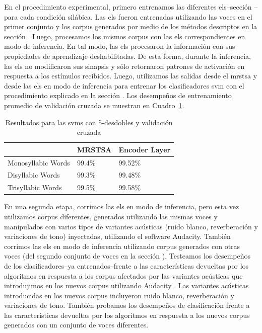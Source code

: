 {En el procedimiento experimental, primero entrenamos las diferentes \glspl{el}--sección --para cada condición silábica. Las \glspl{el}  fueron entrenadas utilizando las voces en el primer conjunto y los corpus generados por medio de los métodos descriptos en la sección . Luego, procesamos los mismos corpus con las \glspl{el} correspondientes en modo de inferencia. En tal modo, las \glspl{el} procesaron la información con sus propiedades de aprendizaje deshabilitadas. De esta forma, durante la inferencia, las \glspl{el} no modificaron sus sinapsis y sólo retornaron patrones de activación en respuesta a los estímulos recibidos. Luego, utilizamos las salidas desde el \gls{mrstsa} y desde las \glspl{el} en modo de inferencia para entrenar los clasificadores \gls{svm} con el procedimiento explicado en la sección . Los desempeños de entrenamiento promedio de validación cruzada se muestran en Cuadro~\ref{SVM_Training}.

\begin{table}[h!]
\centering
\caption{Resultados para las \glspl{svm} con 5-desdobles y validación cruzada}
\begin{tabular}{|l|l|l|}
\hline
		   & MRSTSA & Encoder Layer \\ \hline
Monosyllabic Words & 99.4\% & 99.52\%          \\ \hline
Disyllabic Words   & 99.3\%   & 99.48\%        \\ \hline
Trisyllabic Words  & 99.5\% & 99.58\%          \\ \hline
\end{tabular}
\label{SVM_Training}
\end{table}

En una segunda etapa, corrimos las \glspl{el} en modo de inferencia, pero esta vez utilizamos corpus diferentes, generados utilizando las mismas voces y manipulados con varios tipos de variantes acústicas (ruido blanco, reverberación y variaciones de tono) inyectadas, utilizando el software Audacity. También corrimos las \glspl{el} en modo de inferencia utilizando corpus generados con otras voces (del segundo conjunto de voces en la sección ). Testeamos los desempeños de los clasificadores--ya entrenados--frente a las características devueltas por los algoritmos en respuesta a los corpus afectados por las variantes acústicas que introdujimos en los nuevos corpus utilizando Audacity \cite{audacity}. Las variantes acústicas introducidas en los nuevos corpus incluyeron ruido blanco, reverberación y variaciones de tono. También probamos los desempeños de clasificación frente a las características devueltas por los algoritmos en respuesta a los nuevos corpus generados con un conjunto de voces diferentes.
}{
}
